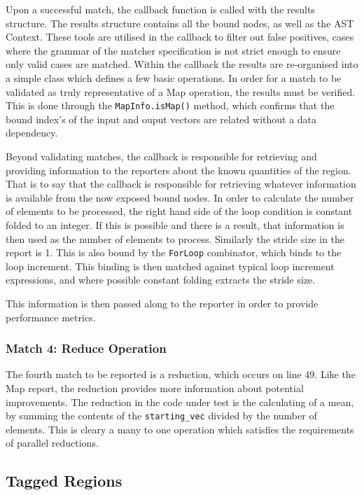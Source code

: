 Upon a successful match, the callback function is called with the results structure. The results
structure contains all the bound nodes, as well as the AST Context. These tools are utilised in the
callback to filter out false positives, cases where the grammar of the matcher specification is not
strict enough to ensure only valid cases are matched. Within the callback the results are
re-organised into a simple class which defines a few basic operations. In order for a match to be
validated as truly representative of a Map operation, the results must be verified. This is done
through the \lstinline{MapInfo.isMap()} method, which confirms that the bound index's of the input
and ouput vectors are related without a data dependency.

Beyond validating matches, the callback is responsible for retrieving and providing information to
the reporters about the known quantities of the region. That is to say that the callback is
responsible for retrieving whatever information is available from the now exposed bound nodes.  In
order to calculate the number of elements to be processed, the right hand side of the loop condition
is constant folded to an integer. If this is possible and there is a result, that information is
then used as the number of elements to process. Similarly the stride size in the report is 1. This
is also bound by the \lstinline{ForLoop} combinator, which binds to the loop increment. This binding
is then matched against typical loop increment expressions, and where possible constant folding
extracts the stride size.

This information is then passed along to the reporter in order to provide performance metrics.

\subsubsection{Match 4: Reduce Operation}
The fourth match to be reported is a reduction, which occurs on line 49. Like the Map report, the
reduction provides more information about potential improvements. The reduction in the code under
test is the calculating of a mean, by summing the contents of the \lstinline{starting_vec} divided
by the number of elements. This is cleary a many to one operation which satisfies the requirements
of parallel reductions. 



\subsection{Tagged Regions}\label{TaggedRegion}



